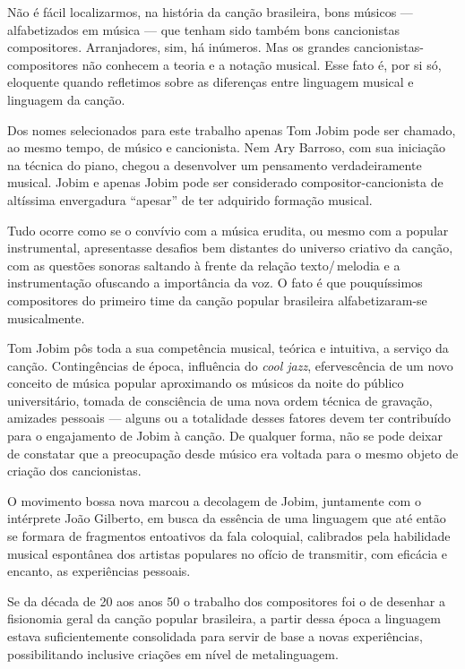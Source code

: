 Não é fácil localizarmos, na história da canção brasileira, bons músicos
--- alfabetizados em música --- que tenham sido também bons cancionistas
compositores. Arranjadores, sim, há inúmeros. Mas os grandes
cancionistas-compositores não conhecem a teoria e a notação musical.
Esse fato é, por si só, eloquente quando refletimos sobre as diferenças
entre linguagem musical e linguagem da canção.

Dos nomes selecionados para este trabalho apenas Tom Jobim pode ser
chamado, ao mesmo tempo, de músico e cancionista. Nem Ary Barroso, com
sua iniciação na técnica do piano, chegou a desenvolver um pensamento
verdadeiramente musical. Jobim e apenas Jobim pode ser considerado
compositor-cancionista de altíssima envergadura ``apesar'' de ter
adquirido formação musical.

Tudo ocorre como se o convívio com a música erudita, ou mesmo com a
popular instrumental, apresentasse desafios bem distantes do universo
criativo da canção, com as questões sonoras saltando à frente da relação
texto/\,melodia e a instrumentação ofuscando a importância da voz. O fato
é que pouquíssimos compositores do primeiro time da canção popular
brasileira alfabetizaram-se musicalmente.

Tom Jobim pôs toda a sua competência musical, teórica e intuitiva, a
serviço da canção. Contingências de época, influência do \textit{cool jazz},
efervescência de um novo conceito de música popular aproximando os
músicos da noite do público universitário, tomada de consciência de uma
nova ordem técnica de gravação, amizades pessoais --- alguns ou a
totalidade desses fatores devem ter contribuído para o engajamento de
Jobim à canção. De qualquer forma, não se pode deixar de constatar que a
preocupação desde músico era voltada para o mesmo objeto de criação dos
cancionistas.

O movimento bossa nova marcou a decolagem de Jobim, juntamente com o
intérprete João Gilberto, em busca da essência de uma linguagem que até
então se formara de fragmentos entoativos da fala coloquial, calibrados
pela habilidade musical espontânea dos artistas populares no ofício de
transmitir, com eficácia e encanto, as experiências pessoais.

Se da década de 20 aos anos 50 o trabalho dos compositores foi o de
desenhar a fisionomia geral da canção popular brasileira, a partir dessa
época a linguagem estava suficientemente consolidada para servir de base
a novas experiências, possibilitando inclusive criações em nível de
metalinguagem.

